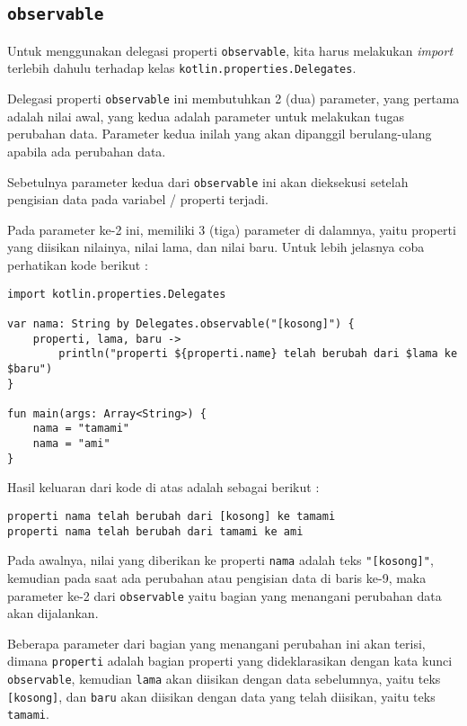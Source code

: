 \subsection{\texttt{observable}}

Untuk menggunakan delegasi properti \texttt{observable}, kita harus melakukan \textit{import} terlebih dahulu terhadap kelas \texttt{kotlin.properties.Delegates}.

Delegasi properti \texttt{observable} ini membutuhkan 2 (dua) parameter, yang pertama adalah nilai awal, yang kedua adalah parameter untuk melakukan tugas perubahan data. Parameter kedua inilah yang akan dipanggil berulang-ulang apabila ada perubahan data.

Sebetulnya parameter kedua dari \texttt{observable} ini akan dieksekusi setelah pengisian data pada variabel / properti terjadi.

Pada parameter ke-2 ini, memiliki 3 (tiga) parameter di dalamnya, yaitu properti yang diisikan nilainya, nilai lama, dan nilai baru. Untuk lebih jelasnya coba perhatikan kode berikut :

\begin{lstlisting}
import kotlin.properties.Delegates

var nama: String by Delegates.observable("[kosong]") {
	properti, lama, baru -> 
		println("properti ${properti.name} telah berubah dari $lama ke $baru")
}

fun main(args: Array<String>) {
	nama = "tamami"
	nama = "ami"
}
\end{lstlisting}

Hasil keluaran dari kode di atas adalah sebagai berikut :

\begin{lstlisting}
properti nama telah berubah dari [kosong] ke tamami
properti nama telah berubah dari tamami ke ami
\end{lstlisting}

Pada awalnya, nilai yang diberikan ke properti \texttt{nama} adalah teks \texttt{"[kosong]"}, kemudian pada saat ada perubahan atau pengisian data di baris ke-9, maka parameter ke-2 dari \texttt{observable} yaitu bagian yang menangani perubahan data akan dijalankan. 

Beberapa parameter dari bagian yang menangani perubahan ini akan terisi, dimana \texttt{properti} adalah bagian properti yang dideklarasikan dengan kata kunci \texttt{observable}, kemudian \texttt{lama} akan diisikan dengan data sebelumnya, yaitu teks \texttt{[kosong]}, dan \texttt{baru} akan diisikan dengan data yang telah diisikan, yaitu teks \texttt{tamami}. 


